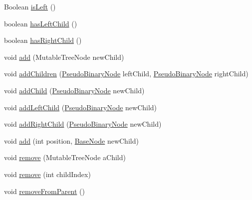 \begin{DoxyCompactItemize}
\item 
Boolean \hyperlink{classit_1_1emarolab_1_1cagg_1_1core_1_1PseudoBinaryNode_a77d68054d2137f059a32bf880d86c28e}{is\-Left} ()
\item 
boolean \hyperlink{classit_1_1emarolab_1_1cagg_1_1core_1_1PseudoBinaryNode_a46d5b375c70824f1e2201fd89e7fb85e}{has\-Left\-Child} ()
\item 
boolean \hyperlink{classit_1_1emarolab_1_1cagg_1_1core_1_1PseudoBinaryNode_a02b349e910f5fef2189d78549b89a2f9}{has\-Right\-Child} ()
\item 
void \hyperlink{classit_1_1emarolab_1_1cagg_1_1core_1_1PseudoBinaryNode_aaa8fe0d251b944e04ea41ffcffe58062}{add} (Mutable\-Tree\-Node new\-Child)
\item 
void \hyperlink{classit_1_1emarolab_1_1cagg_1_1core_1_1PseudoBinaryNode_a1504bc28c199900bc792c6632b2cd4f3}{add\-Children} (\hyperlink{classit_1_1emarolab_1_1cagg_1_1core_1_1PseudoBinaryNode}{Pseudo\-Binary\-Node} left\-Child, \hyperlink{classit_1_1emarolab_1_1cagg_1_1core_1_1PseudoBinaryNode}{Pseudo\-Binary\-Node} right\-Child)
\item 
void \hyperlink{classit_1_1emarolab_1_1cagg_1_1core_1_1PseudoBinaryNode_a5f83922eb37d10763cbc422ff1606b85}{add\-Child} (\hyperlink{classit_1_1emarolab_1_1cagg_1_1core_1_1PseudoBinaryNode}{Pseudo\-Binary\-Node} new\-Child)
\item 
void \hyperlink{classit_1_1emarolab_1_1cagg_1_1core_1_1PseudoBinaryNode_a10c01fe5b9c20992277fa95040095876}{add\-Left\-Child} (\hyperlink{classit_1_1emarolab_1_1cagg_1_1core_1_1PseudoBinaryNode}{Pseudo\-Binary\-Node} new\-Child)
\item 
void \hyperlink{classit_1_1emarolab_1_1cagg_1_1core_1_1PseudoBinaryNode_ae21e9cc91424b2c645636b7dc0eedf3a}{add\-Right\-Child} (\hyperlink{classit_1_1emarolab_1_1cagg_1_1core_1_1PseudoBinaryNode}{Pseudo\-Binary\-Node} new\-Child)
\item 
void \hyperlink{classit_1_1emarolab_1_1cagg_1_1core_1_1PseudoBinaryNode_ab107e3d63d3cccf893c8944102e67df6}{add} (int position, \hyperlink{classit_1_1emarolab_1_1cagg_1_1core_1_1BaseNode}{Base\-Node} new\-Child)
\item 
void \hyperlink{classit_1_1emarolab_1_1cagg_1_1core_1_1PseudoBinaryNode_a5db6516c9b6b642501e8f1cf6b89a2e1}{remove} (Mutable\-Tree\-Node a\-Child)
\item 
void \hyperlink{classit_1_1emarolab_1_1cagg_1_1core_1_1PseudoBinaryNode_a6db14420a79490f839ec4a61eec6e62b}{remove} (int child\-Index)
\item 
void \hyperlink{classit_1_1emarolab_1_1cagg_1_1core_1_1PseudoBinaryNode_a4294063038eae56bf1c2030f31eb03ff}{remove\-From\-Parent} ()

\end{DoxyCompactItemize}
